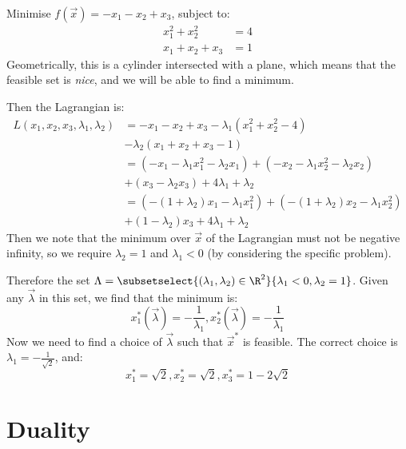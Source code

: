\documentclass[../Main.tex]{subfiles}
\begin{document}
\begin{example}
    Minimise $f(\vec{x}) = -x_1 - x_2 + x_3$, subject to:
    \begin{align*}
        x_1^2 + x_2^2 &= 4 \\
        x_1 + x_2 + x_3 &= 1
    \end{align*}
    Geometrically, this is a cylinder intersected with a plane, which means that the feasible set is \textit{nice}, and we will be able to find a minimum.

    Then the Lagrangian is:
    \begin{align*}
        L(x_1, x_2, x_3, \lambda_1, \lambda_2) &= -x_1 - x_2 + x_3 - \lambda_1(x_1^2 + x_2^2 - 4) \\
        &- \lambda_2(x_1 + x_2 + x_3 - 1) \\
        &= (-x_1 - \lambda_1 x_1^2 - \lambda_2 x_1) + (-x_2 - \lambda_1 x_2^2 - \lambda_2 x_2) \\
        &+(x_3 - \lambda_2 x_3) + 4\lambda_1 + \lambda_2 \\
        &= \left(-(1 + \lambda_2) x_1 - \lambda_1 x_1^2\right) + \left(-(1 + \lambda_2)x_2 - \lambda_1 x_2^2\right)\\
        &+ \left(1 - \lambda_2\right)x_3 + 4\lambda_1 + \lambda_2
    \end{align*}
    Then we note that the minimum over $\vec{x}$ of the Lagrangian must not be negative infinity, so we require $\lambda_2 = 1$ and $\lambda_1 < 0$ (by considering the specific problem).
    
    Therefore the set $\Lambda = \subsetselect{(\lambda_1, \lambda_2) \in \R^2}{\lambda_1 < 0, \lambda_2 = 1}$.
    Given any $\vec{\lambda}$ in this set, we find that the minimum is:
    \begin{equation*}
        x_1^*(\vec{\lambda}) = -\frac{1}{\lambda_1}, x_2^*(\vec{\lambda}) = -\frac{1}{\lambda_1}
    \end{equation*}
    Now we need to find a choice of $\vec{\lambda}$ such that $\vec{x}^*$ is feasible. The correct choice is $\lambda_1 = -\frac{1}{\sqrt{2}}$, and:
    \begin{equation*}
        x_1^* = \sqrt{2}, x_2^* = \sqrt{2}, x_3^* = 1 - 2\sqrt{2}
    \end{equation*}
\end{example}
\section{Duality}
\end{document}
